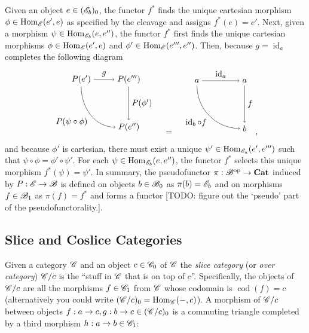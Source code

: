 \documentclass[10pt]{article}
\theoremstyle{definition}
\theoremstyle{remark}
\DeclareMathOperator{\id}{id}
\newcommand{\opcat}{\mathrm{op}}
\DeclareMathOperator{\Hom}{Hom}
\DeclareMathOperator{\cod}{cod}
\begin{document}
Given an object $e \in (\mathscr{E}_b)_0$, the functor $f^{\ast}$ finds the unique cartesian morphism $\phi \in \Hom_{\catE}(e',e)$ as specified by the cleavage and assigns $f^{\ast}(e) = e'$. Next, given a morphism $\psi \in \Hom_{\catE_{b}}(e, e'')$, the functor $f^{\ast}$ first finds the unique cartesian morphisms $\phi \in \Hom_{\catE}(e', e)$ and $\phi' \in \Hom_{\catE}(e''', e'')$. Then, because $g = \id_a$ completes the following diagram
\[
    \begin{tikzpicture}
        \draw (-1,+1) node(tl){$P(e')$};
        \draw (+1,+1) node(tr){$P(e''')$};
        \draw (+1,-1) node(br){$P(e'')$};

        \draw[->] (tl) to node[above]{$g$} (tr);
        \draw[->] (tl) to[out=-90, in=180] node[below left]{$P(\psi\circ\phi)$} (br);
        \draw[->] (tr) to node[right]{$P(\phi')$} (br);
    \end{tikzpicture}
    \quad=\quad
    \begin{tikzpicture}
        \draw (-1,+1) node(tl){$a$};
        \draw (+1,+1) node(tr){$a$};
        \draw (+1,-1) node(br){$b$};

        \draw[->] (tl) to node[above]{$\id_{a}$} (tr);
        \draw[->] (tl) to[out=-90, in=180] node[below left]{$\id_{b} \circ f$} (br);
        \draw[->] (tr) to node[right]{$f$} (br);
    \end{tikzpicture},
\]
and because $\phi'$ is cartesian, there must exist a unique $\psi' \in \Hom_{\catE_a}(e', e''')$ such that $\psi \circ \phi = \phi' \circ \psi'$. For each $\psi \in \Hom_{\catE_b}(e, e'')$, the functor $f^{\ast}$ selects this unique morphism $f^{\ast}(\psi) = \psi'$. In summary, the pseudofunctor $\pi : \catB^{\opcat} \to \mathbf{Cat}$ induced by $P : \mathscr{E} \to \mathscr{B}$ is defined on objects $b \in \mathscr{B}_{0}$ as $\pi(b) = \mathscr{E}_{b}$ and on morphisms $f \in \mathscr{B}_{1}$ as $\pi(f) = f^{\ast}$ and forms a functor \textcolor{red!50!black}{[TODO: figure out the `pseudo' part of the pseudofunctorality.]}.

\subsection{Slice and Coslice Categories}

Given a category $\mathscr{C}$ and an object $c \in \mathscr{C}_0$ of $\mathscr{C}$ the \textit{slice category} (or \textit{over category}) $\mathscr{C}/c$ is the ``stuff in $\mathscr{C}$ that is on top of $c$''. Specifically, the objects of $\mathscr{C}/c$ are all the morphisms $f \in \mathscr{C}_1$ from $\mathscr{C}$ whose codomain is $\cod(f) = c$ (alternatively you could write $(\catC/c)_0 = \Hom_{\catC}(-,c)$). A morphism of $\mathscr{C}/c$ between objects $f : a \to c, g : b \to c \in (\mathscr{C}/c)_0$ is a commuting triangle completed by a third morphism $h : a \to b \in \mathscr{C}_1$:
\end{document}

